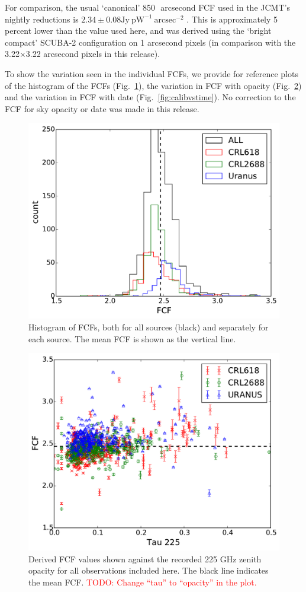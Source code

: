 \documentclass[usenatbib]{mnras}
\newcommand{\todo}[1]{\textcolor{red}{TODO: #1}}
\begin{document}
For comparison, the usual `canonical' 850\,\micron\ arcsecond FCF used
in the JCMT's nightly reductions is
$2.34 \pm 0.08 \mathrm{Jy}\ \mathrm{pW}^{-1}\ \mathrm{arcsec}^{-2}$
\citep{Dempsey2013}. This is approximately 5 percent lower than the
value used here, and was derived using the `bright compact' SCUBA-2
configuration on 1 arcsecond pixels (in comparison with the
3.22$\times$3.22 arcsecond pixels in this release).

To show the variation seen in the individual FCFs, we provide for
reference plots of the histogram of the FCFs
(Fig.~\ref{fig:calibhist}), the variation in FCF with opacity
(Fig.~\ref{fig:calibvstau}) and the variation in FCF with date
(Fig.~\ref{fig:calibvstime}). No correction to the FCF for sky opacity or date
was made in this release.

\begin{figure}
  \centering
  \includegraphics[width=0.7\linewidth]{Legacy_calibration_histogram}
  \caption{Histogram of FCFs, both for all sources (black) and
    separately for each source. The mean FCF is shown as the vertical line. }
  \label{fig:calibhist}
\end{figure}

\begin{figure}
  \centering
  \includegraphics[width=0.7\linewidth]{Legacy_calibration_vstau}
  \caption{Derived FCF values shown against the recorded 225 GHz zenith opacity
    for all observations included here. The black line indicates the
    mean FCF.
    \todo{Change ``tau'' to ``opacity'' in the plot.}}
  \label{fig:calibvstau}
\end{figure}
\end{document}
